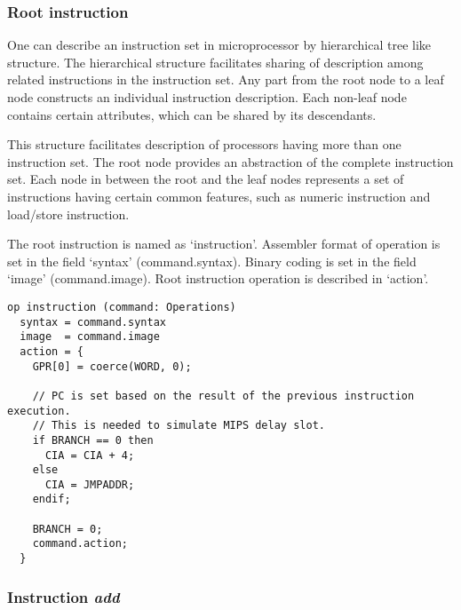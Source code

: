 \documentclass[oneside,final,12pt]{extreport}
\begin{document}
\bigskip



\subsubsection*{Root instruction}

\bigskip

One can describe an instruction set in microprocessor by hierarchical tree like structure. The hierarchical structure facilitates sharing of description among related instructions in the instruction set. Any part from the root node to a leaf node constructs an individual instruction description. Each non-leaf node contains certain attributes, which can be shared by its descendants. 

\bigskip

This structure facilitates description of processors having more than one instruction set. The root node provides an abstraction of the complete instruction set. Each node in between the root and the leaf nodes represents a set of instructions having certain common features, such as numeric instruction and load/store instruction. 

\bigskip

The root instruction is named as ‘instruction’. Assembler format of operation is set in the field ‘syntax’ (command.syntax). Binary coding is set in the field  ‘image’ (command.image). Root instruction operation is described in ‘action’.

\bigskip

\begin{verbatim}
op instruction (command: Operations)
  syntax = command.syntax
  image  = command.image
  action = {
    GPR[0] = coerce(WORD, 0);

    // PC is set based on the result of the previous instruction execution.
    // This is needed to simulate MIPS delay slot.
    if BRANCH == 0 then
      CIA = CIA + 4;
    else
      CIA = JMPADDR;
    endif;

    BRANCH = 0;
    command.action;
  }

\end{verbatim}



\subsubsection*{Instruction \itshape \bfseries add}
\end{document}
